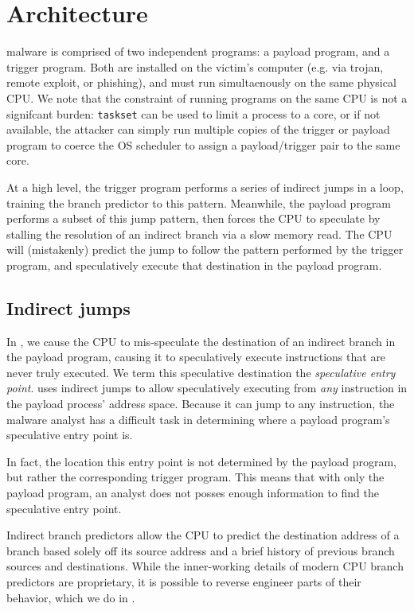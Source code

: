

\section{Architecture}


\speculake malware is comprised of two independent programs: a payload program,
and a trigger program. Both are installed on the victim's computer (e.g. via
trojan, remote exploit, or phishing), and must run simultaenously on the same
physical CPU. We note that the constraint of running programs on the same CPU is
not a signifcant burden: \texttt{taskset} can be used to limit a process to a
core, or if not available, the attacker can simply run multiple copies of the
trigger or payload program to coerce the OS scheduler to assign a
payload/trigger pair to the same core.

At a high level, the trigger program performs a series of indirect jumps in a
loop, training the branch predictor to this pattern. Meanwhile, the
payload program performs a subset of this jump pattern, then forces the CPU to
speculate by stalling the resolution of an indirect branch via a slow memory
read. The CPU will (mistakenly) predict the jump to follow the pattern performed
by the trigger program, and speculatively execute that destination in the
payload program.

\subsection{Indirect jumps}


In \speculake, we cause the CPU to mis-speculate the destination of an indirect
branch in the payload program, causing it to speculatively execute 
instructions that are never truly executed. We term this speculative destination
the \emph{speculative entry point}. \speculake uses indirect jumps to allow
speculatively executing from \emph{any} instruction in the payload process'
address space. Because it can jump to any instruction, the malware analyst has a
difficult task in determining where a payload program's speculative entry point
is.

In fact, the location this entry point is not determined by the payload
program, but rather the corresponding trigger program. This means that with only
the payload program, an analyst does not posses enough information to find the
speculative entry point.



Indirect branch predictors allow the CPU to predict the destination address of a
branch based solely off its source address and a brief history of previous
branch sources and destinations. While the inner-working details of modern CPU
branch predictors are proprietary, it is possible to reverse engineer parts of
their behavior, which we do in \speculake.

